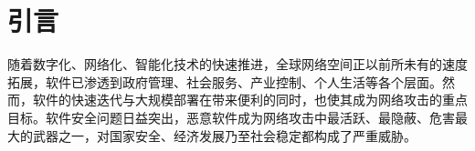 %
%
%
%
\chapter{引言}

\label{chap:intro}

随着数字化、网络化、智能化技术的快速推进，全球网络空间正以前所未有的速度拓展，软件已渗透到政府管理、社会服务、产业控制、个人生活等各个层面。然而，软件的快速迭代与大规模部署在带来便利的同时，也使其成为网络攻击的重点目标。软件安全问题日益突出，恶意软件成为网络攻击中最活跃、最隐蔽、危害最大的武器之一，对国家安全、经济发展乃至社会稳定都构成了严重威胁。



